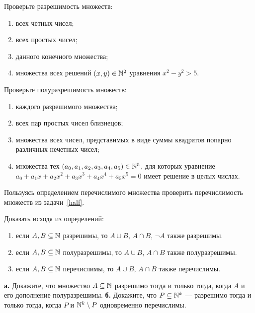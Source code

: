 \documentclass[a4paper, 12pt, num=ТА2]{listok}
\begin{document}
\begin{problem}
	Проверьте разрешимость множеств:
	\begin{enumerate}
		\item всех четных чисел;
		\item всех простых чисел;
		\item данного конечного множества;
		\item множества всех решений $(x, y) \in \mathbb{N}^2$ уравнения $x^2 - y^2 > 5$.
	\end{enumerate}
\end{problem}
\begin{problem}\label{half}
	Проверьте полуразрешимость множеств:
	\begin{enumerate}
		\item каждого разрешимого множества;
		\item всех пар простых чисел  близнецов;
		\item множества всех чисел, представимых в виде суммы квадратов попарно различных нечетных чисел;
		\item множества тех $(a_0, a_1, a_2, a_3, a_4, a_5) \in \mathbb{N}^5$, для которых уравнение
			$a_0 + a_1 x + a_2 x^2 + a_3 x^3 + a_4 x^4 + a_5 x^5 = 0$ имеет решение в целых числах.
	\end{enumerate}
\end{problem}
\begin{problem}[\star]
	Пользуясь определением перечислимого множества проверить перечислимость множеств из задачи~\ref{half}.
\end{problem}
\begin{problem}
	Доказать исходя из определений:
	\begin{enumerate}
		\item если $A, B \subseteq \mathbb{N}$ разрешимы, то $A \cup B$, $A \cap B$, $\neg A$ также разрешимы.
		\item если $A, B \subseteq \mathbb{N}$ полуразрешимы, то $A \cup B$, $A \cap B$ также полуразрешимы.
		\item если $A, B \subseteq \mathbb{N}$ перечислимы, то $A \cup B$, $A \cap B$ также перечислимы.
	\end{enumerate}
\end{problem}
\begin{problem}
	\textbf{а.} Докажите, что множество $A \subseteq \mathbb{N}$ разрешимо тогда и только тогда, когда $A$ и его дополнение полуразрешимы.
	\textbf{б\point.} Докажите, что $P\subseteq \mathbb{N}^k$ --- разрешимо тогда и только тогда, когда $P$ и $\mathbb{N}^k \setminus P$ одновременно перечислимы.
\end{problem}
\end{document}
